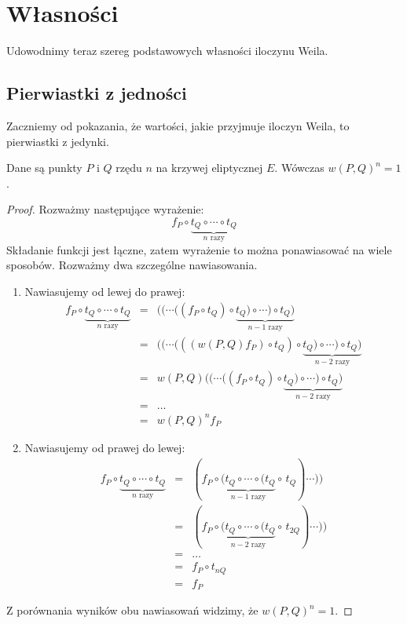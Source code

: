 \section{Własności}

\noindent
Udowodnimy teraz szereg podstawowych własności iloczynu Weila.

\subsection*{Pierwiastki z jedności}

\noindent
Zaczniemy od pokazania, że wartości, jakie przyjmuje iloczyn Weila,
to pierwiastki z jedynki.

\begin{theorem}
Dane są punkty $P$ i $Q$ rzędu $n$ na krzywej eliptycznej $E$.
Wówczas $w(P,Q)^n = 1$.
\end{theorem}

\begin{proof}
Rozważmy następujące wyrażenie:
\begin{equation*}
f_P \circ \underbrace{t_Q \circ \cdots \circ t_Q}_{n\textrm{ razy}}
\end{equation*}
Składanie funkcji jest łączne,
zatem wyrażenie to można ponawiasować na wiele sposobów.
Rozważmy dwa szczególne nawiasowania.
\begin{enumerate}
\item
Nawiasujemy od lewej do prawej:
\begin{eqnarray*}
f_P \circ \underbrace{t_Q \circ \cdots \circ t_Q}_{n\textrm{ razy}}
& = & ((\cdots((f_P \circ t_Q) \circ
      \underbrace{t_Q) \circ \cdots ) \circ t_Q)}_{n-1\textrm{ razy}} \\
& = & ((\cdots(((w(P,Q)f_P) \circ t_Q) \circ
      \underbrace{t_Q) \circ \cdots ) \circ t_Q)}_{n-2\textrm{ razy}} \\
& = & w(P,Q)((\cdots((f_P \circ t_Q) \circ
      \underbrace{t_Q) \circ \cdots ) \circ t_Q)}_{n-2\textrm{ razy}} \\
& = & \ldots \\
& = & w(P,Q)^nf_P
\end{eqnarray*}
\item
Nawiasujemy od prawej do lewej:
\begin{eqnarray*}
f_P \circ \underbrace{t_Q \circ \cdots \circ t_Q}_{n\textrm{ razy}}
& = & (f_P \circ
      \underbrace{(t_Q \circ \cdots \circ (t_Q}_{n-1\textrm{ razy}}
      \circ\,t_Q)\cdots)) \\
& = & (f_P \circ
      \underbrace{(t_Q \circ \cdots \circ (t_Q}_{n-2\textrm{ razy}}
      \circ\,t_{2Q})\cdots)) \\
& = & \ldots \\
& = & f_P \circ t_{nQ} \\
& = & f_P
\end{eqnarray*}
\end{enumerate}
Z porównania wyników obu nawiasowań widzimy, że $w(P,Q)^n = 1$.
\end{proof}

